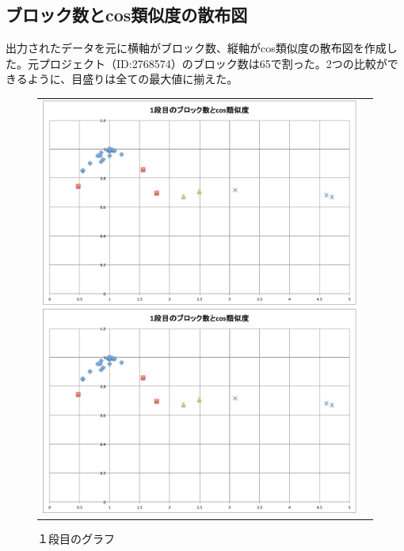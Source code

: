 \documentclass[a4paper,10pt,onecolumn,oneside,openany]{jsbook}
\begin{document}
 \newpage
\subsection{ブロック数とcos類似度の散布図}
 出力されたデータを元に横軸がブロック数、縦軸がcos類似度の散布図を作成した。元プロジェクト（ID:2768574）のブロック数は65で割った。2つの比較ができるように、目盛りは全ての最大値に揃えた。

\begin{figure}[h]
 \begin{tabular}{cc}
 	\begin{minipage}[t]{0.45\hsize}
	 \centering
	 \includegraphics[keepaspectratio, scale = 0.26]{mazegame_first_block.pdf}
	 \includegraphics[keepaspectratio, scale = 0.25]{mazegame_first_block.pdf}
	 \caption{１段目のグラフ}
	 \label{mazegame_first_block_cos}
	\end{minipage}
        \begin{minipage}[t]{0.45\hsize}

\end{minipage}
\end{tabular}
\end{figure}
\end{document}
